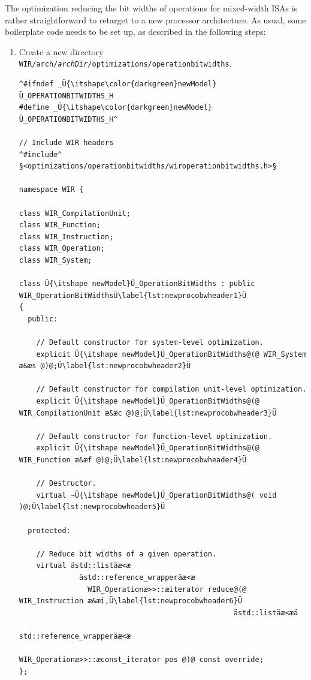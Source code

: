 The optimization reducing the bit widths of operations for mixed-width \glspl{ISA} is rather straightforward to retarget to a new processor architecture.
As usual, some boilerplate code needs to be set up, as described in the following steps:
\begin{enumerate}
  \item Create a new directory \texttt{WIR/arch/{\itshape archDir}/optimizations/operationbitwidths}.

\begin{lstlisting}[style=code,float=!t,caption={Header File for a New Processor Model's Operation Bit Width Reduction},label=lst:newprocobwheader]
^#ifndef _Ü{\itshape\color{darkgreen}newModel}Ü_OPERATIONBITWIDTHS_H
#define _Ü{\itshape\color{darkgreen}newModel}Ü_OPERATIONBITWIDTHS_H^

// Include WIR headers
^#include^ §<optimizations/operationbitwidths/wiroperationbitwidths.h>§

namespace WIR {

class WIR_CompilationUnit;
class WIR_Function;
class WIR_Instruction;
class WIR_Operation;
class WIR_System;

class Ü{\itshape newModel}Ü_OperationBitWidths : public WIR_OperationBitWidthsÜ\label{lst:newprocobwheader1}Ü
{
  public:

    // Default constructor for system-level optimization.
    explicit Ü{\itshape newModel}Ü_OperationBitWidths@(@ WIR_System æ&æs @)@;Ü\label{lst:newprocobwheader2}Ü

    // Default constructor for compilation unit-level optimization.
    explicit Ü{\itshape newModel}Ü_OperationBitWidths@(@ WIR_CompilationUnit æ&æc @)@;Ü\label{lst:newprocobwheader3}Ü

    // Default constructor for function-level optimization.
    explicit Ü{\itshape newModel}Ü_OperationBitWidths@(@ WIR_Function æ&æf @)@;Ü\label{lst:newprocobwheader4}Ü

    // Destructor.
    virtual ~Ü{\itshape newModel}Ü_OperationBitWidths@( void )@;Ü\label{lst:newprocobwheader5}Ü

  protected:

    // Reduce bit widths of a given operation.
    virtual ästd::listäæ<æ
              ästd::reference_wrapperäæ<æ
                WIR_Operationæ>>::æiterator reduce@(@ WIR_Instruction æ&æi,Ü\label{lst:newprocobwheader6}Ü
                                                  ästd::listäæ<æä
                                                    std::reference_wrapperäæ<æ
                                                      WIR_Operationæ>>::æconst_iterator pos @)@ const override;
};


\end{lstlisting}
\end{enumerate}
